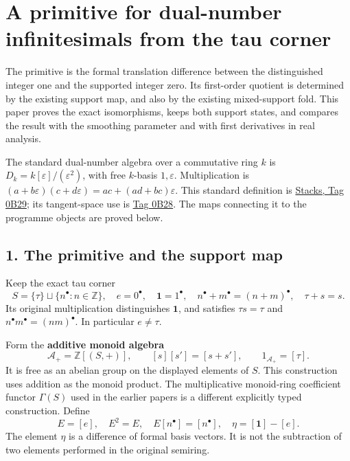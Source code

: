 \documentclass[
]{article}
\author{}
\date{}
\begin{document}
{
\setcounter{tocdepth}{3}
\tableofcontents
}
\section{A primitive for dual-number infinitesimals from the tau
corner}\label{a-primitive-for-dual-number-infinitesimals-from-the-tau-corner}

The primitive is the formal translation difference between the
distinguished integer one and the supported integer zero. Its
first-order quotient is determined by the existing support map, and also
by the existing mixed-support fold. This paper proves the exact
isomorphisms, keeps both support states, and compares the result with
the smoothing parameter and with first derivatives in real analysis.

The standard dual-number algebra over a commutative ring \(k\) is
\(D_k=k[\varepsilon]/(\varepsilon^2)\), with free \(k\)-basis
\(1,\varepsilon\). Multiplication is
\((a+b\varepsilon)(c+d\varepsilon)=ac+(ad+bc)\varepsilon\). This
standard definition is
\href{https://stacks.math.columbia.edu/tag/0B29}{Stacks, Tag 0B29}; its
tangent-space use is
\href{https://stacks.math.columbia.edu/tag/0B28}{Tag 0B28}. The maps
connecting it to the programme objects are proved below.

\subsection{1. The primitive and the support
map}\label{the-primitive-and-the-support-map}

Keep the exact tau corner \[
S=\{\tau\}\sqcup\{n^\bullet:n\in\mathbb Z\},\quad
e=0^\bullet,\quad \mathbf1=1^\bullet,
\quad n^\bullet+m^\bullet=(n+m)^\bullet,
\quad\tau+s=s.
\tag{DN1}
\] Its original multiplication distinguishes \(\mathbf1\), and satisfies
\(\tau s=\tau\) and \(n^\bullet m^\bullet=(nm)^\bullet\). In particular
\(e\ne\tau\).

Form the \textbf{additive monoid algebra} \[
\mathcal A_+=\mathbb Z[(S,+)],\qquad
[s][s']=[s+s'],\qquad 1_{\mathcal A_+}=[\tau].
\tag{DN2}
\] It is free as an abelian group on the displayed elements of \(S\).
This construction uses addition as the monoid product. The
multiplicative monoid-ring coefficient functor \(\Gamma(S)\) used in the
earlier papers is a different explicitly typed construction. Define \[
E=[e],\quad E^2=E,\quad E[n^\bullet]=[n^\bullet],
\quad\eta=[\mathbf1]-[e].
\tag{DN3}
\] The element \(\eta\) is a difference of formal basis vectors. It is
not the subtraction of two elements performed in the original semiring.
\end{document}
